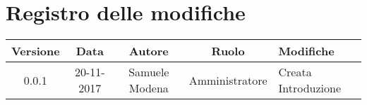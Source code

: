 \documentclass[./NormediProgetto.tex]{subfiles}
\begin{document}
\chapter*{Registro delle modifiche}
\begin{center}	
\begin{tabular}{|c|c|c|c|p{4cm}|}
		\hline
		\textbf{Versione} & \textbf{Data} & \textbf{Autore} & \textbf{Ruolo} & \textbf{Modifiche} \\ \hline
		0.0.1 & 20-11-2017 & Samuele Modena & Amministratore & Creata Introduzione\\ \hline
\end{tabular}
\end{center}
\end{document}
